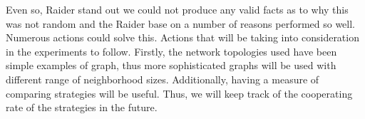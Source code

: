 Even so, Raider stand out we could not produce any valid facts as to why this
was not random and the Raider base on a number of reasons performed so well.
Numerous actions could solve this. Actions that will be taking into consideration
in the experiments to follow. Firstly, the network topologies used have been
simple examples of graph, thus more sophisticated graphs will be used
with different range of neighborhood sizes. Additionally, having a measure of
comparing strategies will be useful. Thus, we will keep track of the cooperating
rate of the strategies in the future.


